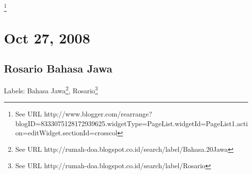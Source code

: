 


\footnote{See URL http://www.blogger.com/rearrange?blogID=8333075128172939625.widgetType=PageList.widgetId=PageList1.action=editWidget.sectionId=crosscol}












\section{Oct 27, 2008}



\subsection{Rosario Bahasa Jawa}







Labels:
Bahasa Jawa\footnote{See URL http://rumah-doa.blogspot.co.id/search/label/Bahasa.20Jawa},
Rosario\footnote{See URL http://rumah-doa.blogspot.co.id/search/label/Rosario}

